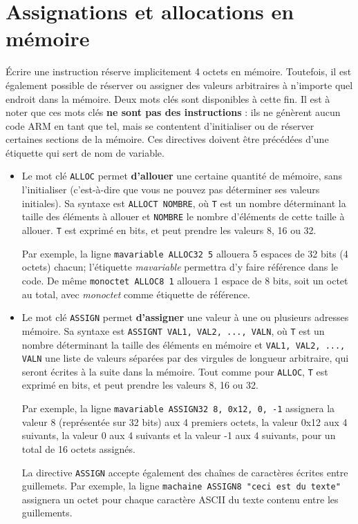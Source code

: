 \documentclass{tufte-handout}
\begin{document}
\clearpage
\section{Assignations et allocations en mémoire}

Écrire une instruction réserve implicitement 4 octets en mémoire. Toutefois, il est également possible de réserver ou assigner des valeurs arbitraires à n'importe quel endroit dans la mémoire. Deux mots clés sont disponibles à cette fin. Il est à noter que ces mots clés \textbf{ne sont pas des instructions} : ils ne génèrent aucun code ARM en tant que tel, mais se contentent d'initialiser ou de réserver certaines sections de la mémoire. Ces directives doivent être précédées d'une étiquette qui sert de nom de variable.

\begin{itemize}
	\item Le mot clé \texttt{ALLOC} permet \textbf{d'allouer} une certaine quantité de mémoire, sans l'initialiser (c'est-à-dire que vous ne pouvez pas déterminer ses valeurs initiales). Sa syntaxe est \texttt{ALLOCT NOMBRE}, où \texttt{T} est un nombre déterminant la taille des éléments à allouer et \texttt{NOMBRE} le nombre d'éléments de cette taille à allouer. \texttt{T} est exprimé en bits, et peut prendre les valeurs 8, 16 ou 32. 
	
	Par exemple, la ligne \texttt{mavariable ALLOC32 5} allouera 5 espaces de 32 bits (4 octets) chacun; l'étiquette \textit{mavariable} permettra d'y faire référence dans le code. De même \texttt{monoctet ALLOC8 1} allouera 1 espace de 8 bits, soit un octet au total, avec \textit{monoctet} comme étiquette de référence.
	
	\item Le mot clé \texttt{ASSIGN} permet \textbf{d'assigner} une valeur à une ou plusieurs adresses mémoire. Sa syntaxe est \texttt{ASSIGNT VAL1, VAL2, ..., VALN}, où \texttt{T} est un nombre déterminant la taille des éléments en mémoire et \texttt{VAL1, VAL2, ..., VALN} une liste de valeurs séparées par des virgules de longueur arbitraire, qui seront écrites à la suite dans la mémoire. Tout comme pour \texttt{ALLOC}, \texttt{T} est exprimé en bits, et peut prendre les valeurs 8, 16 ou 32. 
	
	Par exemple, la ligne \texttt{mavariable ASSIGN32 8, 0x12, 0, -1} assignera la valeur 8 (représentée sur 32 bits) aux 4 premiers octets, la valeur 0x12 aux 4 suivants, la valeur 0 aux 4 suivants et la valeur -1 aux 4 suivants, pour un total de 16 octets assignés.
	
	La directive \texttt{ASSIGN} accepte également des chaînes de caractères écrites entre guillemets. Par exemple, la ligne \texttt{machaine ASSIGN8 "ceci est du texte"} assignera un octet pour chaque caractère ASCII du texte contenu entre les guillements.
\end{itemize}
\end{document}
